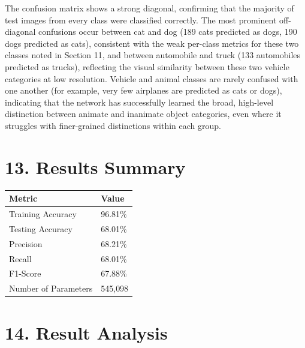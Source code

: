 \documentclass[11pt,a4paper]{article}
\begin{document}
The confusion matrix shows a strong diagonal, confirming that the majority of test images from every class were classified correctly. The most prominent off-diagonal confusions occur between cat and dog (189 cats predicted as dogs, 190 dogs predicted as cats), consistent with the weak per-class metrics for these two classes noted in Section 11, and between automobile and truck (133 automobiles predicted as trucks), reflecting the visual similarity between these two vehicle categories at low resolution. Vehicle and animal classes are rarely confused with one another (for example, very few airplanes are predicted as cats or dogs), indicating that the network has successfully learned the broad, high-level distinction between animate and inanimate object categories, even where it struggles with finer-grained distinctions within each group.

\section*{13. Results Summary}

\begin{center}
\begin{tabular}{|p{6cm}|p{5cm}|}
\hline
\textbf{Metric} & \textbf{Value}\\
\hline
Training Accuracy & 96.81\%\\
\hline
Testing Accuracy & 68.01\%\\
\hline
Precision & 68.21\%\\
\hline
Recall & 68.01\%\\
\hline
F1-Score & 67.88\%\\
\hline
Number of Parameters & 545{,}098\\
\hline
\end{tabular}
\end{center}

\section*{14. Result Analysis}
\end{document}
